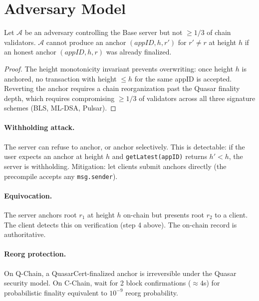 \section{Adversary Model}

\label{sec:adversary}

\begin{theorem}
Let $\mathcal{A}$ be an adversary controlling the Base server but not
$\geq 1/3$ of chain validators. $\mathcal{A}$ cannot produce an anchor
$(appID, h, r')$ for $r' \neq r$ at height $h$ if an honest anchor
$(appID, h, r)$ was already finalized.
\end{theorem}

\begin{proof}
The height monotonicity invariant prevents overwriting: once height $h$ is
anchored, no transaction with height $\leq h$ for the same appID is
accepted. Reverting the anchor requires a chain reorganization past the
Quasar finality depth, which requires compromising $\geq 1/3$ of
validators across all three signature schemes (BLS, ML-DSA, Pulsar).
\end{proof}

\paragraph{Withholding attack.}
The server can refuse to anchor, or anchor selectively. This is detectable:
if the user expects an anchor at height $h$ and \texttt{getLatest(appID)}
returns $h' < h$, the server is withholding. Mitigation: let clients
submit anchors directly (the precompile accepts any \texttt{msg.sender}).

\paragraph{Equivocation.}
The server anchors root $r_1$ at height $h$ on-chain but presents root
$r_2$ to a client. The client detects this on verification (step 4 above).
The on-chain record is authoritative.

\paragraph{Reorg protection.}
On Q-Chain, a QuasarCert-finalized anchor is irreversible under the Quasar
security model. On C-Chain, wait for 2 block confirmations ($\approx 4$s)
for probabilistic finality equivalent to $10^{-9}$ reorg probability.

